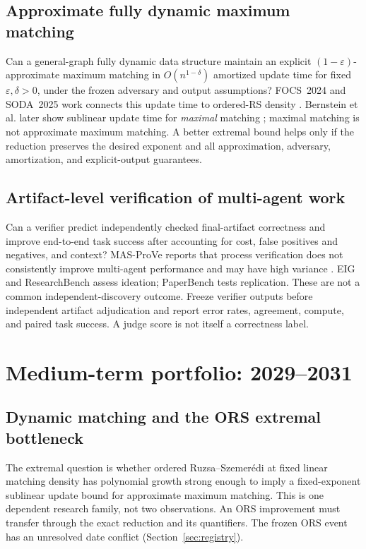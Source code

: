 \documentclass[11pt]{article}
\begin{document}
\subsection{Approximate fully dynamic maximum matching}
Can a general-graph fully dynamic data structure maintain an explicit $(1-\varepsilon)$-approximate maximum matching in $O(n^{1-\delta})$ amortized update time for fixed $\varepsilon,\delta>0$, under the frozen adversary and output assumptions? FOCS~2024 and SODA~2025 work connects this update time to ordered-RS density \citep{behnezhad2024dynamic,assadi2025ors}. Bernstein et al. later show sublinear update time for \emph{maximal} matching \citep{bernstein2025maximal}; maximal matching is not approximate maximum matching. A better extremal bound helps only if the reduction preserves the desired exponent and all approximation, adversary, amortization, and explicit-output guarantees.

\subsection{Artifact-level verification of multi-agent work}
Can a verifier predict independently checked final-artifact correctness and improve end-to-end task success after accounting for cost, false positives and negatives, and context? MAS-ProVe reports that process verification does not consistently improve multi-agent performance and may have high variance \citep{venkataramani2026masprove}. EIG and ResearchBench assess ideation; PaperBench tests replication. These are not a common independent-discovery outcome. Freeze verifier outputs before independent artifact adjudication and report error rates, agreement, compute, and paired task success. A judge score is not itself a correctness label.

\section{Medium-term portfolio: 2029--2031}
\subsection{Dynamic matching and the ORS extremal bottleneck}
The extremal question is whether ordered Ruzsa--Szemer\'edi at fixed linear matching density has polynomial growth strong enough to imply a fixed-exponent sublinear update bound for approximate maximum matching. This is one dependent research family, not two observations. An ORS improvement must transfer through the exact reduction and its quantifiers. The frozen ORS event has an unresolved date conflict (Section~\ref{sec:registry}).
\end{document}
